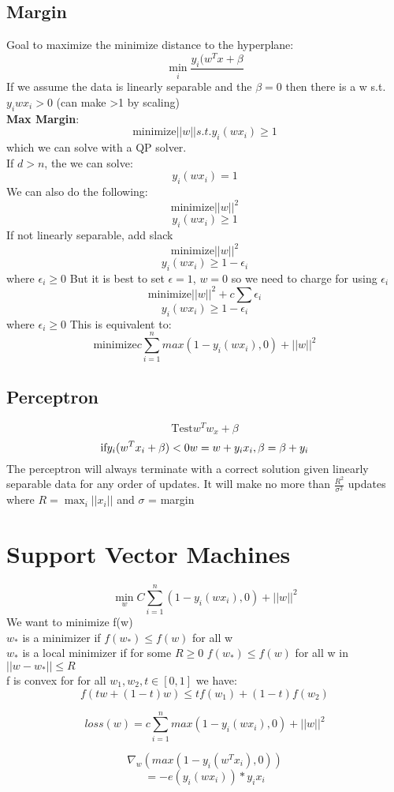 \documentclass{article}
\begin{document}
\subsection{Margin}
Goal to maximize the minimize distance to the hyperplane: $$\min_i \frac{y_i(w^Tx + \beta}{}$$
If we assume the data is linearly separable and the $\beta=0$ then there is a w s.t. $y_iwx_i > 0$ (can make >1 by scaling) \\
\textbf{Max Margin}: 
$$\textrm{minimize} ||w|| s.t. y_i(wx_i) \geq 1$$ which we can solve with a QP solver. \\ 
If $d>n$, the we can solve:
$$y_i(wx_i) = 1$$
We can also do the following:
$$\textrm{minimize} ||w||^2$$ $$y_i(wx_i) \geq 1$$ If not linearly separable, add slack
$$\textrm{minimize} ||w||^2$$ $$y_i(wx_i) \geq 1 - \epsilon_i$$ where $\epsilon_i \geq 0$
But it is best to set $\epsilon =1$, $w=0$ so we need to charge for using $\epsilon_i$
$$\textrm{minimize} ||w||^2 + c\sum \epsilon_i$$ $$y_i(wx_i) \geq 1 - \epsilon_i$$ where $\epsilon_i \geq 0$ This is equivalent to:
$$\textrm{minimize} c \sum_{i=1}^n max(1 - y_i(wx_i),0) +  ||w||^2$$
\subsection{Perceptron}
$$\textrm{Test} w^Tw_x + \beta$$
$$\textrm{if} y_i(w^Tx_i + \beta) < 0 \\ w = w + y_ix_i,\beta = \beta + y_i$$
The perceptron will always terminate with a correct solution given linearly separable data for any order of updates. It will make no more than $\frac{R^2}{\sigma^2}$ updates where $R = \max_i ||x_i||$ and $\sigma$ = margin

\section{Support Vector Machines}
$$\min_w C \sum_{i=1}^n (1-y_i(wx_i),0) + ||w||^2$$ 
We want to minimize f(w) \\
$w_*$ is a minimizer if $f(w_*) \leq f(w)$ for all w \\
$w_*$ is a local minimizer if for some $R \geq 0$ $f(w_*) \leq f(w)$  for all w in $||w-w_*|| \leq R$ \\
f is convex for for all $w_1, w_2, t \in [0,1]$ we have:
$$f(tw + (1-t)w) \leq tf(w_1) + (1-t)f(w_2)$$

$$loss(w) = c \sum_{i=1}^n max(1-y_i(wx_i),0) + ||w||^2$$

$$\nabla_w (max(1-y_i(w^Tx_i),0))$$
$$=-e(y_i(wx_i)) * y_ix_i$$
\end{document}
